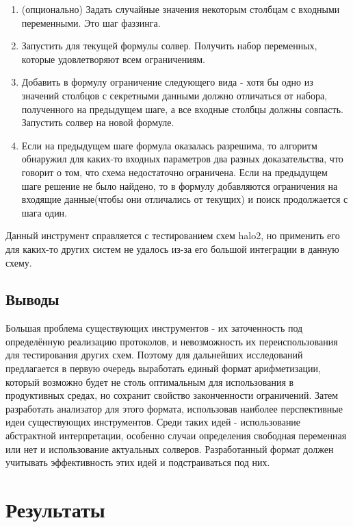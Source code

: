 \documentclass[a4paper]{article}
\begin{document}
\begin{enumerate}
    \item (опционально) Задать случайные значения некоторым столбцам с входными переменными. Это шаг фаззинга.
    \item Запустить для текущей формулы солвер. Получить набор переменных, которые удовлетворяют всем ограничениям.
    \item Добавить в формулу ограничение следующего вида - хотя бы одно из значений столбцов с секретными данными должно отличаться от набора, полученного на предыдущем шаге, а все входные столбцы должны совпасть. Запустить солвер на новой формуле.
    \item Если на предыдущем шаге формула оказалась разрешима, то алгоритм обнаружил для каких-то входных параметров два разных доказательства, что говорит о том, что схема недостаточно ограничена. Если на предыдущем шаге решение не было найдено, то в формулу добавляются ограничения на входящие данные(чтобы они отличались от текущих) и поиск продолжается с шага один.
\end{enumerate}

Данный инструмент справляется с тестированием схем halo2, но применить его для каких-то других систем не удалось из-за его большой интеграции в данную схему.

\subsection{Выводы}
\indent

Большая проблема существующих инструментов - их заточенность под определённую реализацию протоколов, и невозможность их переиспользования для тестирования других схем. Поэтому для дальнейших исследований предлагается в первую очередь выработать единый формат арифметизации, который возможно будет не столь оптимальным для использования в продуктивных средах, но сохранит свойство законченности ограничений. Затем разработать анализатор для этого формата, использовав наиболее перспективные идеи существующих инструментов. Среди таких идей - использование абстрактной интерпретации, особенно случаи определения свободная переменная или нет и использование актуальных солверов. Разработанный формат должен учитывать эффективность этих идей и подстраиваться под них.

\section{Результаты}
\indent
\end{document}
